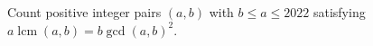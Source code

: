 Count positive integer pairs $(a,b)$ with $b\le a\le2022$ satisfying $a\operatorname{lcm}(a,b)=b\gcd(a,b)^2$.
